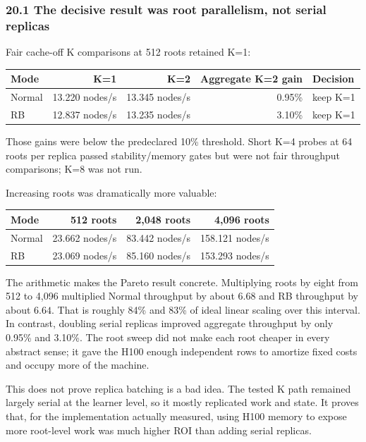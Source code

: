 \documentclass[
  10pt,
  letterpaper,
]{article}
\newcounter{none} %
\begin{document}
\subsubsection{20.1 The decisive result was root parallelism, not serial
replicas}\label{201-the-decisive-result-was-root-parallelism-not-serial-replicas}

Fair cache-off K comparisons at 512 roots retained K=1:

{\def\LTcaptype{none} %
\begin{longtable}[]{@{}lrrrl@{}}
\toprule\noalign{}
Mode & K=1 & K=2 & Aggregate K=2 gain & Decision \\
\midrule\noalign{}
\endhead
\bottomrule\noalign{}
\endlastfoot
Normal & 13.220 nodes/s & 13.345 nodes/s & 0.95\% & keep K=1 \\
RB & 12.837 nodes/s & 13.235 nodes/s & 3.10\% & keep K=1 \\
\end{longtable}
}

Those gains were below the predeclared 10\% threshold. Short K=4 probes
at 64 roots per replica passed stability/memory gates but were not fair
throughput comparisons; K=8 was not run.

Increasing roots was dramatically more valuable:

{\def\LTcaptype{none} %
\begin{longtable}[]{@{}lrrr@{}}
\toprule\noalign{}
Mode & 512 roots & 2,048 roots & 4,096 roots \\
\midrule\noalign{}
\endhead
\bottomrule\noalign{}
\endlastfoot
Normal & 23.662 nodes/s & 83.442 nodes/s & 158.121 nodes/s \\
RB & 23.069 nodes/s & 85.160 nodes/s & 153.293 nodes/s \\
\end{longtable}
}

The arithmetic makes the Pareto result concrete. Multiplying roots by
eight from 512 to 4,096 multiplied Normal throughput by about \(6.68\)
and RB throughput by about \(6.64\). That is roughly 84\% and 83\% of
ideal linear scaling over this interval. In contrast, doubling serial
replicas improved aggregate throughput by only 0.95\% and 3.10\%. The
root sweep did not make each root cheaper in every abstract sense; it
gave the H100 enough independent rows to amortize fixed costs and occupy
more of the machine.

This does not prove replica batching is a bad idea. The tested K path
remained largely serial at the learner level, so it mostly replicated
work and state. It proves that, for the implementation actually
measured, using H100 memory to expose more root-level work was much
higher ROI than adding serial replicas.
\end{document}
